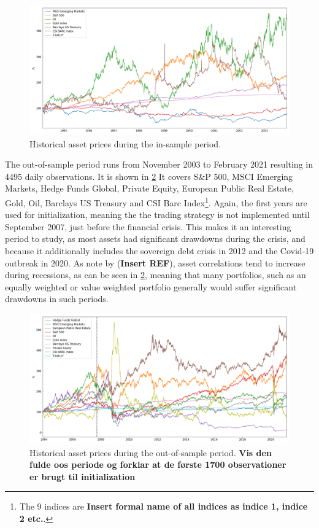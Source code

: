 \begin{figure}[H]
    \centering
    \includegraphics[width=1\textwidth]{analysis/portfolio_exercise/images/asset_vals_insample.png}
    \caption[Historical asset prices during the in-sample period]{Historical asset prices during the in-sample period.}
    \label{fig:MPC_data_is}
\end{figure}

The out-of-sample period runs from November 2003 to February 2021 resulting in 4495 daily observations. It is shown in \cref{fig:MPC_data_oos} It covers S\&P 500, MSCI Emerging Markets, Hedge Funds Global, Private Equity, European Public Real Estate, Gold, Oil, Barclays US Treasury and CSI Barc Index\footnote{
The 9 indices are \textbf{Insert formal name of all indices as indice 1, indice 2 etc.}.
}.
Again, the first years are used for initialization, meaning the the trading strategy is not implemented until September 2007, just before the financial crisis. This makes it an interesting period to study, as most assets had significant drawdowns during the crisis, and because it additionally includes the sovereign debt crisis in 2012 and the Covid-19 outbreak in 2020. As note by (\textbf{Insert REF}), asset correlations tend to increase during recessions, as can be seen in \cref{fig:MPC_data_oos}, meaning that many portfolios, such as an equally weighted or value weighted portfolio generally would suffer significant drawdowns in such periods. 

\begin{figure}[H]
    \centering
    \includegraphics[width=1\textwidth]{analysis/portfolio_exercise/images/asset_vals_oos.png}
    \caption[Historical asset prices during the out-of-sample period]{Historical asset prices during the out-of-sample period. \textbf{Vis den fulde oos periode og forklar at de første 1700 observationer er brugt til initialization}}
    \label{fig:MPC_data_oos}
\end{figure}

